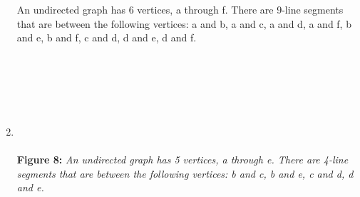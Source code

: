 \documentclass{amsart}
\theoremstyle{definition}
\theoremstyle{Exercise}
\theoremstyle{remark}
\theoremstyle{rule}
\numberwithin{equation}{section}
\begin{document}
\begin{enumerate}[label=(\alph*)]
{{An undirected graph has 6 vertices, a through f. There are 9-line segments that are between the following vertices: a and b, a and c, a and d, a and f, b and e, b and f, c and d, d and e, d and f. }
}
\\\\
\\\\
   \newpage
~\\~\\
\item 
{}
\\\\
{\color{blue} {\bf Figure 8: } \emph{An undirected graph has 5 vertices, a through e. There are 4-line segments that are between the following vertices: b and c, b and e, c and d, d and e. 
  }
}
\\\\
\\\\


\end{enumerate}
\end{document}
